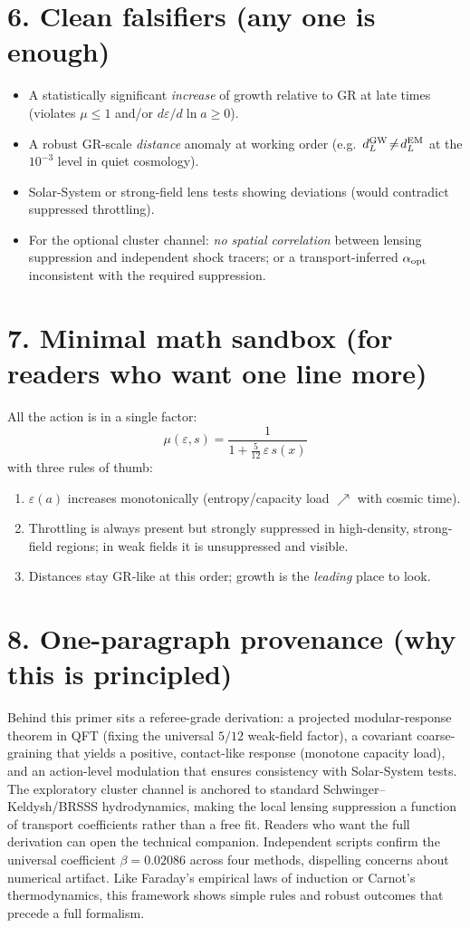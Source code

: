 \documentclass[aps,prd,onecolumn,superscriptaddress,nofootinbib]{revtex4-2}
\newcommand{\eps}{\varepsilon}
\begin{document}
\section*{6. Clean falsifiers (any one is enough)}
\begin{itemize}
\item A statistically significant \emph{increase} of growth relative to GR at late times (violates $\mu\le 1$ and/or $d\eps/d\ln a\ge 0$).
\item A robust GR-scale \emph{distance} anomaly at working order (e.g.\ $d_L^{\rm GW}\!\neq\!d_L^{\rm EM}$ at the $10^{-3}$ level in quiet cosmology).
\item Solar-System or strong-field lens tests showing deviations (would contradict suppressed throttling).
\item For the optional cluster channel: \emph{no spatial correlation} between lensing suppression and independent shock tracers; or a transport-inferred $\alpha_{\rm opt}$ inconsistent with the required suppression.
\end{itemize}

\section*{7. Minimal math sandbox (for readers who want one line more)}
All the action is in a single factor:
\[
\boxed{\quad \mu(\eps,s)=\frac{1}{1+\frac{5}{12}\,\eps\,s(x)} \quad}
\]
with three rules of thumb:
\begin{enumerate}
\item $\eps(a)$ increases monotonically (entropy/capacity load $\nearrow$ with cosmic time).
\item Throttling is always present but strongly suppressed in high-density, strong-field regions; in weak fields it is unsuppressed and visible.
\item Distances stay GR-like at this order; growth is the \emph{leading} place to look.
\end{enumerate}

\section*{8. One-paragraph provenance (why this is principled)}
Behind this primer sits a referee-grade derivation: a projected modular-response theorem in QFT (fixing the universal $5/12$ weak-field factor), a covariant coarse-graining that yields a positive, contact-like response (monotone capacity load), and an action-level modulation that ensures consistency with Solar-System tests. The exploratory cluster channel is anchored to standard Schwinger--Keldysh/BRSSS hydrodynamics, making the local lensing suppression a function of transport coefficients rather than a free fit. Readers who want the full derivation can open the technical companion.
Independent scripts confirm the universal coefficient $\beta = 0.02086$ across four methods, dispelling concerns about numerical artifact. Like Faraday's empirical laws of induction or Carnot's thermodynamics, this framework shows simple rules and robust outcomes that precede a full formalism.
\end{document}
